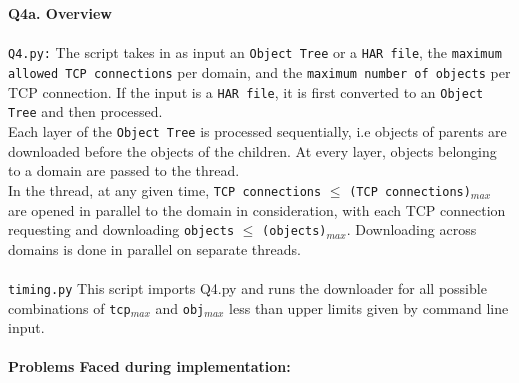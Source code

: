 \documentclass[12pt]{article}
\begin{document}
~\\\\
{\bfseries Q4a. Overview} %
\\\\\texttt{Q4.py:} The script takes in as input an \texttt{Object Tree} or a \texttt{HAR file}, the \texttt{maximum allowed TCP connections} per domain, and the \texttt{maximum number of objects} per TCP connection. If the input is a \texttt{HAR file}, it is first converted to an \texttt{Object Tree} and then processed. \\
Each layer of the \texttt{Object Tree} is processed sequentially, i.e objects of parents are downloaded before the objects of the children. At every layer, objects belonging to a domain are passed to the thread.\\
In the thread, at any given time, \texttt{TCP connections} $\leq$ \texttt{(TCP connections)$_{max}$} are opened in parallel to the domain in consideration, with each TCP connection requesting and downloading \texttt{objects} $\leq$ \texttt{(objects)$_{max}$}. Downloading across domains is done in parallel on separate threads.
\\\\
\texttt{timing.py} This script imports Q4.py and runs the downloader for all possible combinations of \texttt{tcp$_{max}$} and \texttt{obj$_{max}$} less than upper limits given by command line input.
~\\\\
\textbf{Problems Faced during implementation:}
\end{document}

